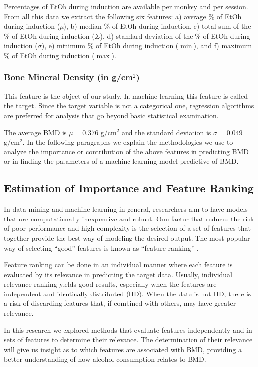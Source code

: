 \documentclass{bmcart}
\begin{document}
Percentages of EtOh during induction are available per monkey and per session.
From all this data we extract the following six features: a)
average \% of EtOh during induction ($\mu$), b) median \% of EtOh during
induction, c) total sum of the \% of EtOh during induction ($\Sigma$), d)
standard deviation of the \% of EtOh during induction ($\sigma$), e)
minimum \% of EtOh during induction ($\min$), and f) maximum \% of EtOh during
induction ($\max$).

\subsubsection*{Bone Mineral Density (in g/cm$^2$)}
This feature is the object of our study. In machine learning this feature is
called the target. Since the target variable is not a categorical one,
regression algorithms are preferred for analysis that go beyond basic
statistical examination.  

The average BMD is $\mu = 0.376$ g/cm$^2$ and the standard deviation is $\sigma =
0.049$g/cm$^2$. In the following paragraphs we explain the methodologies we use to
analyze the importance or contribution of the above features in predicting BMD
or in finding the parameters of a machine learning model predictive of BMD.


\subsection*{Estimation of Importance and Feature Ranking}

In data mining and machine learning in general, researchers aim to have models
that are computationally inexpensive and robust. One factor that reduces the
risk of poor performance and high complexity is the selection of a set of
features that together provide the best way of modeling the desired output. The
most popular way of selecting ``good'' features is known as ``feature ranking''
\cite{guyon2008feature}.

Feature ranking can be done in an individual manner where each feature is
evaluated by its relevance in predicting the target data. Usually,
individual relevance ranking yields good results, especially when the
features are independent and identically distributed (IID). When the data is
not IID, there is a risk of discarding features that, if combined with others,
may have greater relevance.

In this research we explored methods that evaluate features independently and
in sets of features to determine their relevance. The determination of their
relevance will give us insight as to which features are associated with BMD,
providing a better understanding of how alcohol consumption relates to BMD.
\end{document}
